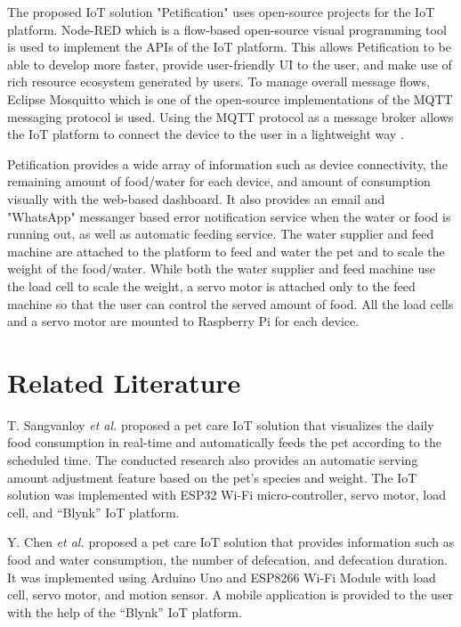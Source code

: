 ﻿\documentclass[conference]{IEEEtran}
\begin{document}
The proposed IoT solution "Petification" uses open-source projects for the IoT platform.
Node-RED which is a flow-based open-source visual programming tool \cite{b7} is used to implement the APIs of the IoT platform.
This allows Petification to be able to develop more faster, provide user-friendly UI to the user, and make use of rich resource ecosystem generated by users. 
To manage overall message flows, Eclipse Mosquitto which is one of the open-source implementations of the MQTT messaging protocol is used.
Using the MQTT protocol as a message broker allows the IoT platform to connect the device to the user in a lightweight way \cite{b8}.

Petification provides a wide array of information such as device connectivity, the remaining amount of food/water for each device, and amount of consumption visually with the web-based dashboard.
It also provides an email and "WhatsApp" messanger based error notification service when the water or food is running out, as well as automatic feeding service.
The water supplier and feed machine are attached to the platform to feed and water the pet and to scale the weight of the food/water.
While both the water supplier and feed machine use the load cell to scale the weight, a servo motor is attached only to the feed machine so that the user can control the served amount of food.
All the load cells and a servo motor are mounted to Raspberry Pi for each device.

\section{Related Literature}
T. Sangvanloy \textit{et al.} \cite{b3} proposed a pet care IoT solution that visualizes the daily food consumption in real-time and automatically feeds the pet according to the scheduled time.
The conducted research also provides an automatic serving amount adjustment feature based on the pet's species and weight.
The IoT solution was implemented with ESP32 Wi-Fi micro-controller, servo motor, load cell, and “Blynk” IoT platform.

Y. Chen \textit{et al.} \cite{b4} proposed a pet care IoT solution that provides information such as food and water consumption, the number of defecation, and defecation duration.
It was implemented using Arduino Uno and ESP8266 Wi-Fi Module with load cell, servo motor, and motion sensor.
A mobile application is provided to the user with the help of the “Blynk” IoT platform.
\end{document}
